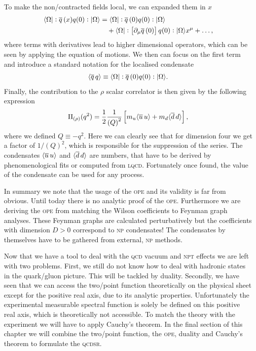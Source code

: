 \documentclass[../../index.tex]{subfiles}
\begin{document}
To make the non\-/contracted fields local, we can expanded them in \(x\)
\begin{equation}
  \begin{split}
    \langle \Omega \vert: \overline{q}\,(x) q(0):\vert \Omega \rangle &= \langle\Omega\vert: \overline{q}\,(0) q(0): \vert\Omega\rangle\\
    &\quad+ \langle\Omega\vert:\left[ \partial_\mu \overline{q}\,(0) \right]
    q(0):\vert\Omega\rangle x^\mu + \dots,
  \end{split}
\end{equation}
where terms with derivatives lead to higher dimensional operators, which can be
seen by applying the equation of motions. We then can focus on the first term
and introduce a standard notation for the localised condensate
\begin{equation}
  \langle \overline{q}\,q \rangle \equiv \langle\Omega\vert: \overline{q}\,(0) q(0):\vert\Omega\rangle.
\end{equation}
Finally, the contribution to the \(\rho\) scalar correlator is then given by the
following expression
\begin{equation}
  \Pi_{(\rho)}(q^2) = \frac{1}{2} \frac{1}{\left(Q\right)^2}
  \left[ m_u\langle \overline{u}\, u \rangle + m_d \langle \overline{d}\, d \rangle\right],
\end{equation}
where we defined \(Q \equiv -q^2\). Here we can clearly see that for dimension
four we get a factor of \(1/(Q)^2\), which is responsible for the suppression of
the series. The condensates \(\langle\overline{u}\,u\rangle\) and
\(\langle\overline{d}\,d\rangle\) are numbers, that have to be derived by
phenomenological fits or computed from \textsc{lqcd}. Fortunately once found,
the value of the condensate can be used for any process.

In summary we note that the usage of the \textsc{ope} and its validity is far
from obvious. Until today there is no analytic proof of the \textsc{ope}.
Furthermore we are deriving the \textsc{ope} from matching the Wilson
coefficients to Feynman graph analyses. These Feynman graphs are calculated
perturbatively but the coefficients with dimension \(D>0\) correspond to
\textsc{np} condensates! The condensates by themselves have to be gathered from
external, \textsc{np} methods.

Now that we have a tool to deal with the \textsc{qcd} vacuum and \textsc{npt}
effects we are left with two problems. First, we still do not know how to deal
with hadronic states in the quark\-/gluon picture. This will be tackled by
duality. Secondly, we have seen that we can access the two\-/point function
theoretically on the physical sheet except for the positive real axis, due to
its analytic properties. Unfortunately the experimental measurable spectral
function is solely be defined on this positive real axis, which is theoretically
not accessible. To match the theory with the experiment we will have to apply
Cauchy's theorem. In the final section of this chapter we will combine the
two\-/point function, the \textsc{ope}, duality and Cauchy's theorem to
formulate the \textsc{qcdsr}.
\end{document}
